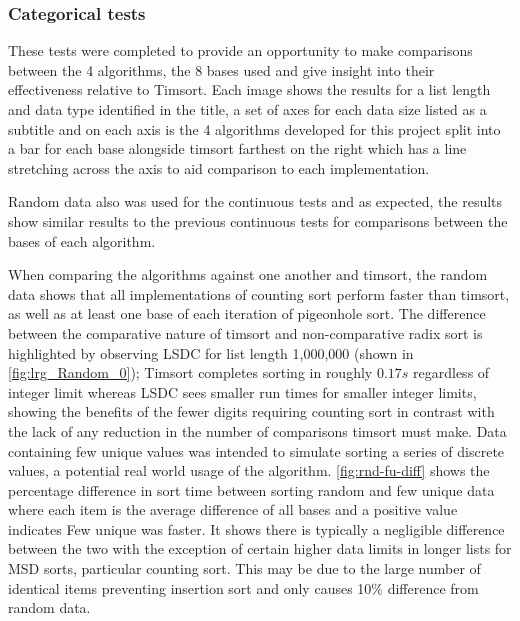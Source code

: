 \documentclass[12pt]{article}
\begin{document}
	\subsubsection{Categorical tests}
	These tests were completed to provide an opportunity to make comparisons between the 4 algorithms, the 8 bases used and give insight into their effectiveness relative to Timsort. Each image shows the results for a list length and data type identified in the title, a set of axes for each data size listed as a subtitle and on each axis is the 4 algorithms developed for this project split into a bar for each base alongside timsort farthest on the right which has a line stretching across the axis to aid comparison to each implementation.
	\begin{table}[b]
		\centering
			\label{fig:lrg_Random_0}

			
	\end{table}
	Random data also was used for the continuous tests and as expected, the results show similar results to the previous continuous tests for comparisons between the bases of each algorithm. 
	\par
	When comparing the algorithms against one another and timsort, the random data shows that all implementations of counting sort perform faster than timsort, as well as at least one base of each iteration of pigeonhole sort. The difference between the comparative nature of timsort and non-comparative radix sort is highlighted by observing LSD\textunderscore C for list length 1,000,000 (shown in \autoref{fig:lrg_Random_0}); Timsort completes sorting in roughly $0.17s$ regardless of integer limit whereas LSD\textunderscore C sees smaller run times for smaller integer limits, showing the benefits of the fewer digits requiring counting sort in contrast with the lack of any reduction in the number of comparisons timsort must make.
	Data containing few unique values was intended to simulate sorting a series of discrete values, a potential real world usage of the algorithm. \autoref{fig:rnd-fu-diff} shows the percentage difference in sort time between sorting random and few unique data where each item is the average difference of all bases and a positive value indicates Few unique was faster. It shows there is typically a negligible difference between the two with the exception of certain higher data limits in longer lists for MSD sorts, particular counting sort. This may be due to the large number of identical items preventing insertion sort and only causes 10\% difference from random data.
\end{document}
